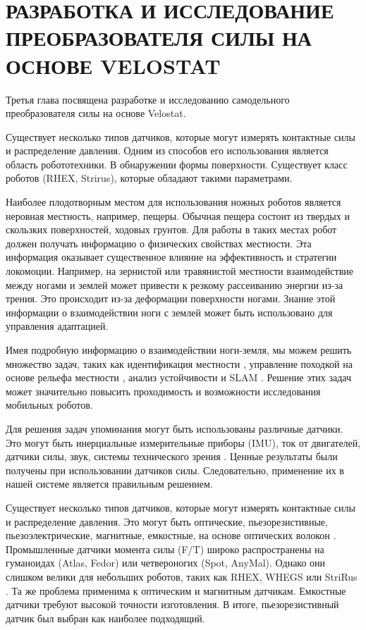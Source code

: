 \chapter{РАЗРАБОТКА И ИССЛЕДОВАНИЕ ПРЕОБРАЗОВАТЕЛЯ СИЛЫ НА ОСНОВЕ VELOSTAT}\label{ch:ch3}

Третья глава посвящена разработке и исследованию самодельного преобразователя силы на основе Velostat.

Существует несколько типов датчиков, которые могут измерять контактные силы и распределение давления. Одним из способов его использования является область робототехники. В обнаружении формы поверхности. Существует класс роботов (RHEX, Strirus), которые обладают такими параметрами.

Наиболее плодотворным местом для использования ножных роботов является неровная местность, например, пещеры. Обычная пещера состоит из твердых и скользких поверхностей, ходовых грунтов. Для работы в таких местах робот должен получать информацию о физических свойствах местности. Эта информация оказывает существенное влияние на эффективность и стратегии локомоции. Например, на зернистой или травянистой местности взаимодействие между ногами и землей может привести к резкому рассеиванию энергии из-за трения. Это происходит из-за деформации поверхности ногами. Знание этой информации о взаимодействии ноги с землей может быть использовано для управления адаптацией.

Имея подробную информацию о взаимодействии ноги-земля, мы можем решить множество задач, таких как идентификация местности \cite{wu_integrated_2016, walas_terrain_2015, mrva_feature_2015, dallaire_learning_2015}, управление походкой на основе рельефа местности \cite{wu_tactile_2020, weingarten_automated_2004}, анализ устойчивости и SLAM \cite{odenthal_nonlinear_1999, peters_analysis_2006, saranli_design_2000}. Решение этих задач может значительно повысить проходимость и возможности исследования мобильных роботов.

Для решения задач упоминания могут быть использованы различные датчики. Это могут быть инерциальные измерительные приборы (IMU), ток от двигателей, датчики силы, звук, системы технического зрения \cite{libby_using_2012,ojeda_terrain_2006,peters_analysis_2006}. Ценные результаты были получены при использовании датчиков силы. Следовательно, применение их в нашей системе является правильным решением.

Существует несколько типов датчиков, которые могут измерять контактные силы и распределение давления. Это могут быть оптические, пьезорезистивные, пьезоэлектрические, магнитные, емкостные, на основе оптических волокон \cite{howe_dynamic_1993}. Промышленные датчики момента силы (F/T) широко распространены на гуманоидах (Atlas, Fedor) или четвероногих (Spot, AnyMal). Однако они слишком велики для небольших роботов, таких как RHEX, WHEGS или StriRus \cite{saranli_rhex_2001,schroer_comparing_2004, bulichev_concept_2018}. Та же проблема применима к оптическим и магнитным датчикам. Емкостные датчики требуют высокой точности изготовления. В итоге, пьезорезистивный датчик был выбран как наиболее подходящий.

